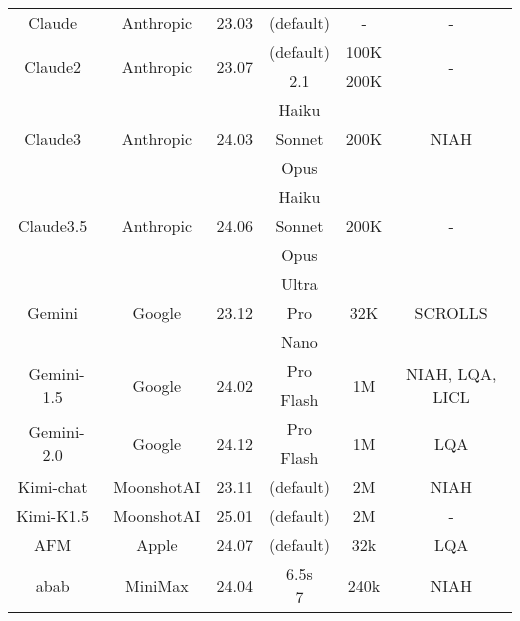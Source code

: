 \begin{table}[!ht]
{\begin{tabular}{cccccc}
    Claude~\citeyearpar{anthropic2023claude} & Anthropic & 23.03 & (default) & - & - \\ 
    \multirow{2}{*}{Claude2~\citeyearpar{anthropic2024claude2}} & \multirow{2}{*}{Anthropic} & \multirow{2}{*}{23.07} & (default) & 100K & \multirow{2}{*}{-} \\ 
     &  &  & 2.1 & 200K & ~ \\ 
    \multirow{3}{*}{Claude3~\citeyearpar{anthropic2024claude3}} & \multirow{3}{*}{Anthropic} & \multirow{3}{*}{24.03} & Haiku & \multirow{3}{*}{200K} & \multirow{3}{*}{NIAH} \\ 
     &  &  & Sonnet & ~ & ~ \\ 
     &  &  & Opus & ~ & ~ \\ 
    \multirow{3}{*}{Claude3.5~\citeyearpar{anthropic2024claude3}} & \multirow{3}{*}{Anthropic} & \multirow{3}{*}{24.06} & Haiku & \multirow{3}{*}{200K} & \multirow{3}{*}{-} \\ 
     &  &  & Sonnet & ~ & ~ \\ 
     &  &  & Opus & ~ & ~ \\ 
     \midrule
    \multirow{3}{*}{Gemini~\citeyearpar{team2023gemini}} & \multirow{3}{*}{Google} & \multirow{3}{*}{23.12} & Ultra & \multirow{3}{*}{32K} & \multirow{3}{*}{SCROLLS} \\ 
     &  &  & Pro &  &  \\ 
     &  & & Nano & ~ & ~ \\ 
    \multirow{2}{*}{Gemini-1.5~\citeyearpar{reid2024gemini}} & \multirow{2}{*}{Google} & \multirow{2}{*}{24.02} & Pro & \multirow{2}{*}{1M} & \multirow{2}{*}{NIAH, LQA, LICL} \\ 
     &  &  & Flash &  & ~ \\ 
    \multirow{2}{*}{Gemini-2.0~\citeyearpar{google2024gemini2}} & \multirow{2}{*}{Google} & \multirow{2}{*}{24.12} & Pro & \multirow{2}{*}{1M} & \multirow{2}{*}{LQA} \\ 
     &  &  & Flash &  &  \\
     
     \midrule
     Kimi-chat~\citeyearpar{kimi} & MoonshotAI & 23.11 & (default) & 2M & NIAH\\ 
     Kimi-K1.5~\citeyearpar{team2025kimi} & MoonshotAI & 25.01 & (default) & 2M & -\\
     \midrule
     
     AFM~\citeyearpar{gunter2024apple} & Apple & 24.07 & (default) & 32k & LQA\\ \midrule

     abab~\citeyearpar{minimax2024} & MiniMax & 24.04 & \makecell[c]{6.5s\\7} & 240k & NIAH\\ \midrule  


\end{tabular}}
\end{table}
